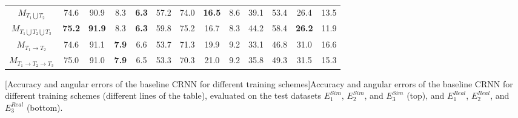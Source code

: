 \begin{table}[t]
{\begin{adjustbox}{width=1.3\textwidth,center}
\begin{tabular}{|c|cccc|cccc|cccc|}
            \textbf{$M_{T_1 \bigcup T_2}$}                   & 74.6                   & 90.9                   & 8.3                   & \textbf{6.3}           & 57.2                   & 74.0                   & \textbf{16.5}         & 8.6                    & 39.1                   & 53.4                   & 26.4                  & 13.5                    \\
            \textbf{$M_{T_1 \bigcup T_2 \bigcup T_3}$}         & \textbf{75.2}          & \textbf{91.9}          & 8.3                   & \textbf{6.3}           & 59.8                   & 75.2                   & 16.7                  & 8.3                    & 44.2                   & 58.4                   & \textbf{26.2}         & 11.9                    \\
            \textbf{$M_{T_1 \rightarrow T_2}$}               & 74.6                   & 91.1                   & \textbf{7.9}          & 6.6                    & 53.7                   & 71.3                   & 19.9                  & 9.2                    & 33.1                   & 46.8                   & 31.0                  & 16.6                    \\
            \textbf{$M_{T_1 \rightarrow T_2 \rightarrow T_3}$} & 75.0                   & 91.0                   & \textbf{7.9}          & 6.5                    & 53.3                   & 70.3                   & 21.0                  & 9.2                    & 35.8                   & 49.3                   & 31.5                  & 15.3                    \\ \hline
            \end{tabular}
        \end{adjustbox}
    }

    [Accuracy and angular errors of the baseline CRNN for different training schemes]{Accuracy and angular errors of the baseline CRNN for different training schemes (different lines of the table), evaluated on the test datasets $E^{Sim}_1$, $E^{Sim}_2$, and $E^{Sim}_3$ (top), and $E^{Real}_1$, $E^{Real}_2$, and $E^{Real}_3$ (bottom).}
    \label{tab:multiLoca_trainingSchemes}
\end{table}



